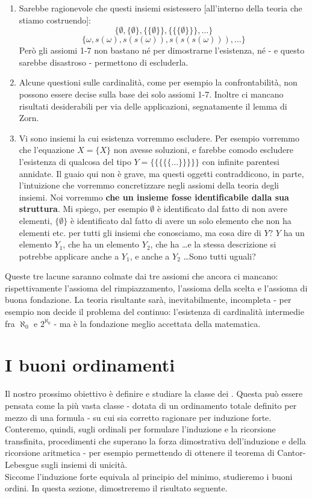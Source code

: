 \documentclass[11pt]{scrartcl}
\begin{document}
\begin{enumerate}[1.]
	\item Sarebbe ragionevole che questi insiemi esistessero [all'interno della teoria che stiamo costruendo]:
	\[ \{\emptyset, \{\emptyset\}, \{\{\emptyset\}\}, \{\{\{\emptyset\}\}\}, \ldots\}
		\]\[ \{\omega, s(\omega), s(s(\omega)), s(s(s(\omega))),\ldots\}
			\]
	Però gli assiomi 1-7 non bastano né per dimostrarne l'esistenza, né - e questo sarebbe disastroso - permettono di escluderla.
	\item Alcune questioni sulle cardinalità, come per esempio la confrontabilità, non possono essere decise sulla base dei solo assiomi 1-7.
	Inoltre ci mancano risultati desiderabili per via delle applicazioni, segnatamente il lemma di Zorn.
	\item Vi sono insiemi la cui esistenza vorremmo escludere. Per esempio vorremmo che l'equazione $X = \{X\}$ non avesse soluzioni, e farebbe comodo escludere 
	l'esistenza di qualcosa del tipo $Y = \{\{\{\{\{\ldots\}\}\}\}\}$ con infinite parentesi annidate. Il guaio qui non è grave, ma questi oggetti contraddicono, in parte, l'intuizione che vorremmo 
	concretizzare negli assiomi della teoria degli insiemi. Noi vorremmo \textbf{che un insieme fosse identificabile dalla sua struttura}. Mi spiego, per esempio $\emptyset$ è identificato dal fatto di non avere elementi,
	$\{\emptyset\}$ è identificato dal fatto di avere un solo elemento che non ha elementi etc. per tutti gli insiemi che conosciamo, ma cosa dire di $Y$? $Y$ ha un elemento $Y_1$, che ha un elemento $Y_2$,
	che ha \ldots e la stessa descrizione si potrebbe applicare anche a $Y_1$, e anche a $Y_2$ \ldots Sono tutti uguali? 
\end{enumerate}

Queste tre lacune saranno colmate dai tre assiomi che ancora ci mancano: rispettivamente l'assioma del rimpiazzamento, l'assioma della scelta e l'assioma di buona fondazione. La teoria risultante sarà,
inevitabilmente, incompleta - per esempio non decide il problema del continuo: l'esistenza di cardinalità intermedie fra $\aleph_0$ e $2^{\aleph_0}$ - ma è la fondazione meglio accettata della matematica.

\newpage
\section{I buoni ordinamenti}
Il nostro prossimo obiettivo è definire e studiare la classe dei . Questa può essere pensata come la più vasta classe
- dotata di un ordinamento totale definito per mezzo di una formula - su cui sia corretto ragionare per induzione forte. Conteremo, quindi, sugli ordinali per formulare 
l'induzione e la ricorsione transfinita, procedimenti che superano la forza dimostrativa dell'induzione e della ricorsione aritmetica - per esempio permettendo di ottenere 
il teorema di Cantor-Lebesgue sugli insiemi di unicità.\\
Siccome l'induzione forte equivala al principio del minimo, studieremo i buoni ordini. In questa sezione, dimostreremo il risultato seguente.
\end{document}
